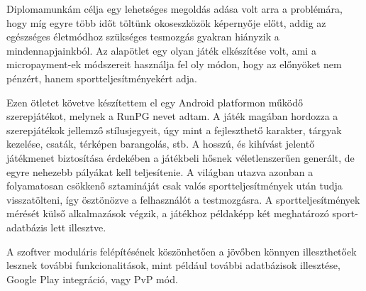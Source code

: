 Diplomamunkám célja egy lehetséges megoldás adása volt arra a problémára, hogy míg egyre több időt töltünk okoseszközök képernyője előtt, addig az egészséges életmódhoz szükséges tesmozgás gyakran hiányzik a mindennapjainkból.
Az alapötlet egy olyan játék elkészítése volt, ami a micropayment-ek módszereit használja fel oly módon, hogy az előnyöket nem pénzért, hanem sportteljesítményekért adja.

Ezen ötletet követve készítettem el egy Android platformon működő szerepjátékot, melynek a RunPG nevet adtam.
A játék magában hordozza a szerepjátékok jellemző stílusjegyeit, úgy mint a fejleszthető karakter, tárgyak kezelése, csaták, térképen barangolás, stb. 
A hosszú, és kihívást jelentő játékmenet biztosítása érdekében a játékbeli hősnek véletlenszerűen generált, de egyre nehezebb pályákat kell teljesítenie.
A világban utazva azonban a folyamatosan csökkenő sztamináját csak valós sportteljesítmények után tudja visszatölteni, így ösztönözve a felhasználót a testmozgásra. 
A sportteljesítmények mérését külső alkalmazások végzik, a játékhoz példaképp két meghatározó sport-adatbázis lett illesztve.

A szoftver moduláris felépítésének köszönhetően a jövőben könnyen illeszthetőek lesznek további funkcionalitások, mint például további adatbázisok illesztése, Google Play integráció, vagy PvP mód. 


